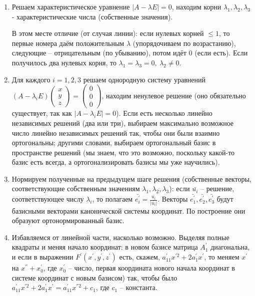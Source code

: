 \documentclass[a4paper, 12pt]{article}
\theoremstyle{definition}
\begin{document}
\begin{enumerate}
    \item Решаем характеристическое уравнение $|A - \lambda E| = 0$, находим корни $\lambda_1, \lambda_2, \lambda_3$ - характеристические числа (собственные значения).
    
    В этом месте отличие (от случая линии): если нулевых корней $\leqslant 1$, то первые номера даём положительным $\lambda$ (упорядочиваем по возрастанию), следующие – отрицательным (по убыванию), потом идёт 0 (если есть). Если получилось два нулевых корня, то $\lambda_1 = \lambda_3 = 0, \ \lambda_2 \neq 0$.
    \item Для каждого $i = 1, 2, 3$ решаем однородную систему уравнений $(A - \lambda_i E) \begin{pmatrix} x \\ y \\ z \end{pmatrix} = \begin{pmatrix} 0\\0\\0 \end{pmatrix}$, находим ненулевое решение (оно обязательно существует, так как $|A - \lambda_i E| = 0$). Если есть несколько линейно независимых решений (два или три), выбираем максимально возможное число линейно независимых решений так, чтобы они были взаимно ортогональны;
    другими словами, выбираем ортогональный базис в пространстве решений (мы знаем, что это возможно, поскольку какой-то базис есть всегда, а ортогонализировать базисы мы уже научились).
    \item Нормируем полученные на предыдущем шаге решения (собственные векторы, соответствующие собственным значениям $\lambda_1, \lambda_2, \lambda_3$):
    если $\bar{u_i}$ – решение, соответствующее числу $\lambda_i$, то полагаем $\bar{e_i^{'}} = \frac{\bar{u_i}}{|\bar{u_i}|}$.
    Векторы $\bar{e_1^{'}}, \bar{e_2^{'}}, \bar{e_3^{'}}$ будут базисными векторами канонической системы координат. По построение они образуют ортонормированный базис.
    \item Избавляемся от линейной части, насколько возможно.
    Выделяя полные квадраты и меняя начало координат: в новом базисе матрица $A_1^{'}$ диагональна, и если в выражении $F^{'}(x^{'},y^{'},z^{'})$ есть, скажем, $a_{11}^{'} x^{'2} + 2a_{1}^{'} x^{'}$, то меняем $x^{'}$ на $x^{''} + x_0^{'}$, где $x_0^{'}$ – число, первая координата нового начала координат в системе координат с новым базисом) так, чтобы было
    $a_{11}^{'} x^{'2} + 2a_{1}^{'} x^{'} = a_{11}^{'} x^{''2} + c_1$, где $c_1$ – константа.

\end{enumerate}
\end{document}

